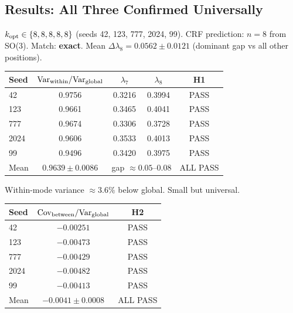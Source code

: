 \documentclass[12pt, a4paper]{article}
\begin{document}
\subsection{Results: All Three Confirmed Universally}

\begin{derivedbox}[title={H3 Confirmed: $k_{\rm opt}=8$ in All 5 Seeds}]
$k_{\rm opt}\in\{8,8,8,8,8\}$ (seeds 42, 123, 777, 2024, 99).
CRF prediction: $n=8$ from SO(3). Match: \textbf{exact}.
Mean $\Delta\lambda_8=0.0562\pm 0.0121$ (dominant gap vs all other positions).
\end{derivedbox}

\begin{derivedbox}[title={H1 Confirmed: Within-Mode Variance Suppression (All 5 Seeds)}]
\begin{center}
\renewcommand{\arraystretch}{1.5}
\begin{tabular}{lcccc}
\toprule
Seed & $\mathrm{Var}_{\rm within}/\mathrm{Var}_{\rm global}$ & $\lambda_7$ & $\lambda_8$ & H1\\
\midrule
42   & 0.9756 & 0.3216 & 0.3994 & PASS \\
123  & 0.9661 & 0.3465 & 0.4041 & PASS \\
777  & 0.9674 & 0.3306 & 0.3728 & PASS \\
2024 & 0.9606 & 0.3533 & 0.4013 & PASS \\
99   & 0.9496 & 0.3420 & 0.3975 & PASS \\
\midrule
Mean & $0.9639\pm 0.0086$ & \multicolumn{2}{c}{gap $\approx 0.05$--$0.08$} & ALL PASS \\
\bottomrule
\end{tabular}
\end{center}
Within-mode variance $\approx 3.6\%$ below global. Small but universal.
\end{derivedbox}

\begin{derivedbox}[title={H2 Confirmed: Between-Mode Anti-Correlation (All 5 Seeds)}]
\begin{center}
\renewcommand{\arraystretch}{1.5}
\begin{tabular}{lcc}
\toprule
Seed & $\mathrm{Cov}_{\rm between}/\mathrm{Var}_{\rm global}$ & H2\\
\midrule
42   & $-0.00251$ & PASS \\
123  & $-0.00473$ & PASS \\
777  & $-0.00429$ & PASS \\
2024 & $-0.00482$ & PASS \\
99   & $-0.00413$ & PASS \\
\midrule
Mean & $-0.0041\pm 0.0008$ & ALL PASS \\
\bottomrule
\end{tabular}
\end{center}
\end{derivedbox}
\end{document}
